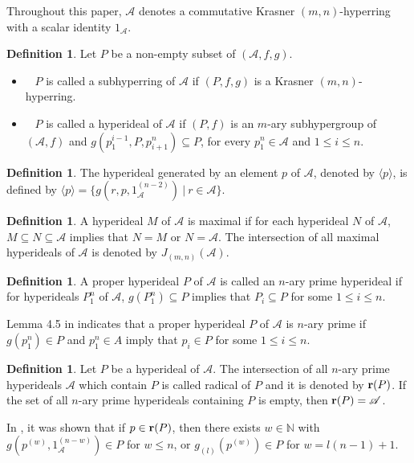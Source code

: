 \documentclass[preprint,review,10pt]{amsart}
\theoremstyle{definition}
\newtheorem{definition}[theorem]{Definition}
\theoremstyle{remark}
\numberwithin{equation}{section}
\begin{document}
Throughout this paper, $\mathscr{A}$ denotes a commutative Krasner $(m,n)$-hyperring with a scalar identity $1_\mathscr{A}$.
\begin{definition}
Let $P$ be a non-empty subset of $(\mathscr{A},f,g)$.  
\begin{itemize} 
\item[\rm{{\bf 1.}}]~ $P$ is called a subhyperring of $\mathscr{A}$ if $(P, f, g)$ is a Krasner $(m, n)$-hyperring. 
\item[\rm{{\bf 2.}}]~ $P$ is called a hyperideal of $\mathscr{A}$ if $(P, f)$ is an $m$-ary subhypergroup
of $(\mathscr{A}, f)$ and $g(p^{i-1}_1, P, p_{i+1}^n) \subseteq P$, for every $p^n _1 \in \mathscr{A}$ and $1 \leq i \leq n$.
\end{itemize}
\end{definition}

\begin{definition} \cite{sorc1} The hyperideal generated by an element $p$ of $\mathscr{A}$, denoted by $\langle p \rangle$,  is defined by $\langle p \rangle=\{g(r,p,1_\mathscr{A}^{(n-2)}) \ \vert \ r \in \mathscr{A}\}.$
\end{definition}
\begin{definition} \cite{sorc1}
A hyperideal $M$ of $\mathscr{A}$
is  maximal if for each hyperideal $N$ of $\mathscr{A}$, $M \subseteq N \subseteq \mathscr{A}$ implies that $N=M$ or $N=\mathscr{A}$. The intersection of all maximal hyperideals of $\mathscr{A}$ is denoted by $J_{(m,n)}(\mathscr{A})$.
\end{definition}



\begin{definition}
\cite{sorc1} A proper hyperideal  $P$ of $\mathscr{A}$ is called an $n$-ary  prime hyperideal if for hyperideals $P_1^n$ of $\mathscr{A}$, $g(P_1^ n) \subseteq P$ implies that $P_i \subseteq P$ for some $1 \leq i \leq n$.
\end{definition}
 Lemma 4.5 in \cite{sorc1} indicates that  a proper hyperideal $P$ of $\mathscr{A}$ is $n$-ary  prime if  $g(p^n_ 1) \in P$ and  $p^n_ 1 \in A$ imply that $p_i \in P$ for some $1 \leq i \leq n$. 

\begin{definition} \cite{sorc1} 
Let $P$ be a hyperideal of $\mathscr{A}$. The intersection of  all $n$-ary prime hyperideals $\mathscr{A}$  which contain   $P$ is called radical of $P$ and it is  denoted by ${\bf r} (P)$. If the set of all $n$-ary prime hyperideals   containing $P$ is empty, then ${\bf r}(P)= \mathscr{A}$.
\end{definition}
In \cite{sorc1}, it was shown  that if $p \in {\bf r}(P)$, then 
there exists $w \in \mathbb {N}$ with $g(p^ {(w)} , 1_\mathscr{A}^{(n-w)} ) \in P$ for $w \leq n$, or $g_{(l)} (p^ {(w)} ) \in P$ for $w = l(n-1) + 1$.
\end{document}
